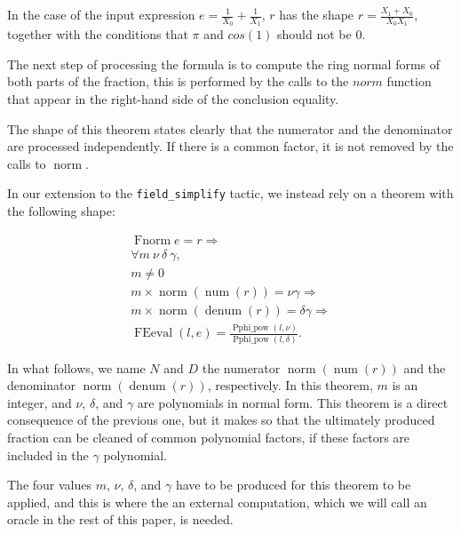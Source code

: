 \documentclass[11pt]{article}
\begin{document}
In the case of the input expression \(e = \frac{1}{X_0} + \frac{1}{X_1}\), \(r\) has the shape \(r = \frac{X_1 + X_0}{X_0 X_1}\), together with the conditions that \(\pi\) and \(cos(1)\) should not be 0.

The next step of processing the formula is to compute the ring normal forms of both parts of the fraction, this is performed by the calls to the \(norm\)
function that appear in the right-hand side of the conclusion equality.

The shape of this theorem states clearly that the numerator and the
denominator are processed independently.  If there is a common factor,
it is not removed by the calls to \(\operatorname{norm}\).

\label{sec:extension-lemma}
In our extension to the {\tt field\_simplify} tactic, we instead rely on a
theorem with the following shape:

\[
\begin{array}{l}
 \operatorname{Fnorm} e = r \Longrightarrow\\
  \forall m~\nu~\delta~\gamma,\\
  m \neq 0 \\

  m \times \operatorname{norm}(\operatorname{num}(r)) = \nu\gamma \Longrightarrow\\
  m \times \operatorname{norm}(\operatorname{denum}(r))= \delta\gamma \Longrightarrow\\
  \operatorname{FEeval}(l,e)=
  \frac{\displaystyle{\operatorname{Pphi\_pow}(l, \nu)}}
       {\displaystyle{\operatorname{Pphi\_pow}(l, \delta)}}.
\end{array}
\]

In what follows, we name \(N\) and \(D\) the numerator \(\operatorname{norm}(\operatorname{num}(r))\) and the denominator \(\operatorname{norm}(\operatorname{denum}(r))\), respectively.  In this theorem, \(m\) is an integer, and \(\nu\), \(\delta\), and \(\gamma\) are polynomials in normal form.  This theorem is a direct consequence of the previous one, but it makes so that the ultimately produced fraction can be cleaned of common polynomial factors, if these factors are included in the \(\gamma\) polynomial.

The four values \(m\), \(\nu\), \(\delta\), and \(\gamma\) have to be produced for this theorem to be applied, and this is where the an external computation, which we will call an oracle in the rest of this paper, is needed.
\end{document}
